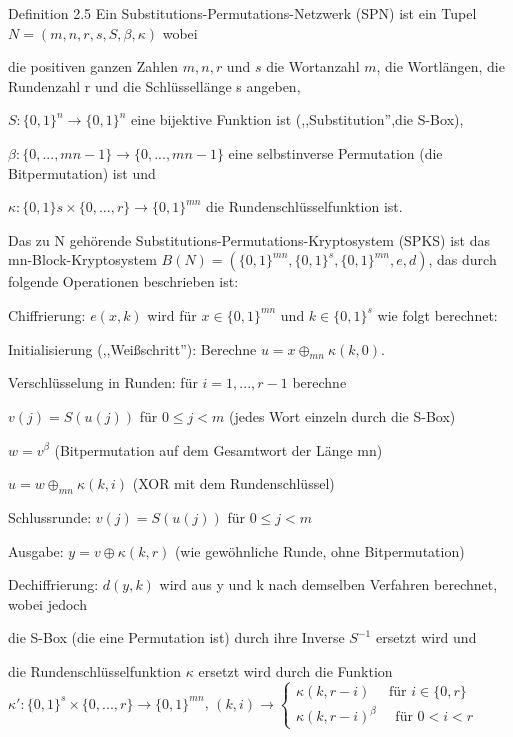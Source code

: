 \documentclass[a4paper]{article}
\begin{document}
\begin{multicols}{3}
    Definition 2.5 Ein Substitutions-Permutations-Netzwerk (SPN) ist ein Tupel $N=(m,n,r,s,S,\beta,\kappa)$ wobei
    \begin{itemize*}
        \item die positiven ganzen Zahlen $m,n,r$ und $s$ die Wortanzahl $m$, die Wortlängen, die Rundenzahl r und die Schlüssellänge s angeben,
        \item $S:\{0,1\}^n\rightarrow\{0,1\}^n$ eine bijektive Funktion ist (,,Substitution'',die S-Box),
        \item ${\beta}:\{0,...,mn-1\}\rightarrow\{0,...,mn-1\}$ eine selbstinverse Permutation (die Bitpermutation) ist und
        \item $\kappa :\{0,1\}s\times\{0,...,r\}\rightarrow\{0,1\}^{mn}$ die Rundenschlüsselfunktion ist.
    \end{itemize*}

    Das zu N gehörende Substitutions-Permutations-Kryptosystem (SPKS) ist das mn-Block-Kryptosystem $B(N)=(\{0,1\}^{mn},\{0,1\}^s,\{0,1\}^{mn},e,d)$, das durch folgende Operationen beschrieben ist:

    Chiffrierung: $e(x,k)$ wird für $x\in\{0,1\}^{mn}$ und $k\in\{0,1\}^s$ wie folgt berechnet:
    \begin{enumerate*}
        \item Initialisierung (,,Weißschritt''): Berechne $u=x\oplus_{mn} \kappa (k,0)$.
        \item Verschlüsselung in Runden: für $i=1,...,r-1$ berechne
        \begin{enumerate*}
            \item $v(j)=S(u(j))$ für $0\leq j<m$ (jedes Wort einzeln durch die S-Box)
            \item $w=v^{\beta}$ (Bitpermutation auf dem Gesamtwort der Länge mn)
            \item $u=w\oplus_{mn} \kappa (k,i)$ (XOR mit dem Rundenschlüssel)
            \item Schlussrunde: $v(j)=S(u(j))$ für $0\leq j<m$
            \item Ausgabe: $y=v\oplus \kappa (k,r)$ (wie gewöhnliche Runde, ohne Bitpermutation)
        \end{enumerate*}
    \end{enumerate*}

    Dechiffrierung: $d(y,k)$ wird aus y und k nach demselben Verfahren berechnet, wobei jedoch
    \begin{enumerate*}
        \item die S-Box (die eine Permutation ist) durch ihre Inverse $S^{-1}$ ersetzt wird und
        \item die Rundenschlüsselfunktion $\kappa$ ersetzt wird durch die Funktion $\kappa':\{0,1\}^s\times\{0,...,r\}\rightarrow\{0,1\}^{mn}$, $(k,i)\rightarrow\begin{cases} \kappa (k,r-i)\quad\text{ für } i\in\{0,r\}\\ \kappa(k,r-i)^{\beta} \quad\text{ für } 0<i<r \end{cases}$
    \end{enumerate*}


\end{multicols}
\end{document}
